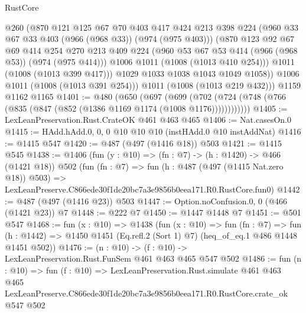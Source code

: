 \begin{lexlean}{RustCore}
\begin{coremodule}
            @260
            (@870
              @121
              @125
              @67
              @70
              @403
              @417
              @424
              @213
              @398
              @224
              (@960 @33 @67 @33 @403 (@966 (@968 @33)) (@974 (@975 @403)))
              (@870
                @123
                @92
                @67
                @69
                @414
                @254
                @270
                @213
                @409
                @224
                (@960 @53 @67 @53 @414 (@966 (@968 @53)) (@974 (@975 @414)))
                @1006
                @1011
                (@1008 (@1013 @410 @254)))
              @1011
              (@1008 (@1013 @399 @417)))
            @1029
            @1033
            @1038
            @1043
            @1049
            @1058))
        @1006
        @1011
        (@1008 (@1013 @391 @254)))
      @1011
      (@1008 (@1013 @219 @432)))
    @1159
    @1162
    @1165
@1401 := @480
    (@650
      (@697
        (@699 (@702 (@724 (@748 (@766 (@835 (@847 (@852 (@1386 @1169 @1174 (@1008 @1176))))))))))))
@1405 := LexLeanPreservation.Rust.CrateOK @461 @463 @465
@1406 := Nat.casesOn.{0}
@1415 := HAdd.hAdd.{0, 0, 0} @10 @10 @10 (instHAdd.{0} @10 instAddNat)
@1416 := @1415 @547
@1420 := @487 (@497 (@1416 @18)) @503
@1421 := @1415 @545
@1438 := @1406
    (fun (y : @10) => (fn : @7) -> (h : @1420) -> @466 (@1421 @18))
    @502
    (fun (fn : @7) =>
    fun (h : @487 (@497 (@1415 Nat.zero @18)) @503) =>
    LexLeanPreserve.C866ede30f1de20bc7a3e9856b0eea171.R0.RustCore.fun0)
@1442 := @487 (@497 (@1416 @23)) @503
@1447 := Option.noConfusion.{0, 0} (@466 (@1421 @23)) @7
@1448 := @222 @7
@1450 := @1447 @1448 @7
@1451 := @501 @547
@1468 := fun (x : @10) =>
  @1438
    (fun (x : @10) =>
    fun (fn : @7) =>
    fun (h : @1442) => @1450 @1451 (Eq.refl.{2} (Sort 1) @7) (heq_of_eq.{1} @486 @1448 @1451 @502))
@1476 := (n : @10) -> (f : @10) -> LexLeanPreservation.Rust.FunSem @461 @463 @465 @547 @502
@1486 := fun (n : @10) =>
  fun (f : @10) =>
  LexLeanPreservation.Rust.simulate
    @461
    @463
    @465
    LexLeanPreserve.C866ede30f1de20bc7a3e9856b0eea171.R0.RustCore.crate_ok
    @547
    @502
\end{coremodule}
\end{lexlean}
